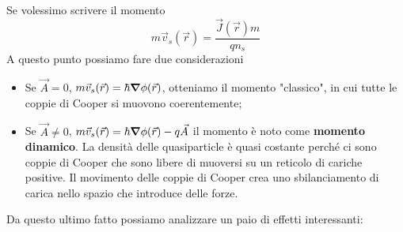 Se volessimo scrivere il momento
\begin{equation*}
    m\vec v_s(\vec r) = \frac{\vec J(\vec r) m}{qn_s}
\end{equation*}
A questo punto possiamo fare due considerazioni
\begin{itemize}
    \item Se $\vec A = 0$, $m\vec v_s(\vec r)=\hbar \grad \phi(\vec r)$, otteniamo il momento "classico", in cui tutte le coppie di Cooper si muovono coerentemente;
    \item Se $\vec A \neq 0$, $m\vec v_s(\vec r)=\hbar \grad \phi(\vec r)-q\vec A$ il momento è noto come \textbf{momento dinamico}. La densità delle quasiparticle è quasi costante perché ci sono coppie di Cooper che sono libere di muoversi su un reticolo di cariche positive. Il movimento delle coppie di Cooper crea uno sbilanciamento di carica nello spazio che introduce delle forze. 
\end{itemize}
Da questo ultimo fatto possiamo analizzare un paio di effetti interessanti:

